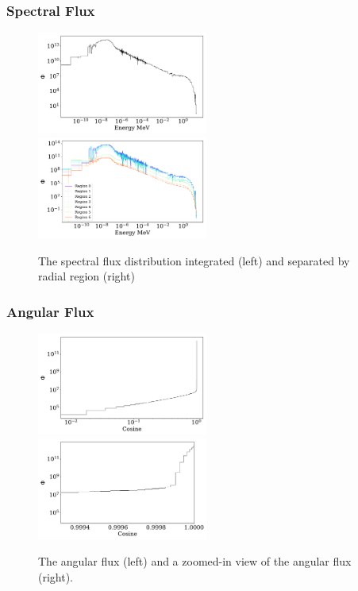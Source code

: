 \documentclass[fleqn]{beamer}
\begin{document}
\begin{frame}
\frametitle{Spectral Flux}

\begin{figure}
\centering
\includegraphics[width = 0.5\textwidth]{flux_erg}
\includegraphics[width = 0.5\textwidth]{flux_rad_erg}
\caption{The spectral flux distribution integrated (left) and separated by radial region (right)}
\end{figure}

\end{frame}

\begin{frame}
\frametitle{Angular Flux}

\begin{figure}
\centering
\includegraphics[width = 0.5\textwidth]{flux_cos}
\includegraphics[width = 0.5\textwidth]{flux_cos_detail}
\caption{The angular flux (left) and a zoomed-in view of the angular flux (right).}
\end{figure}

\end{frame}
\end{document}
